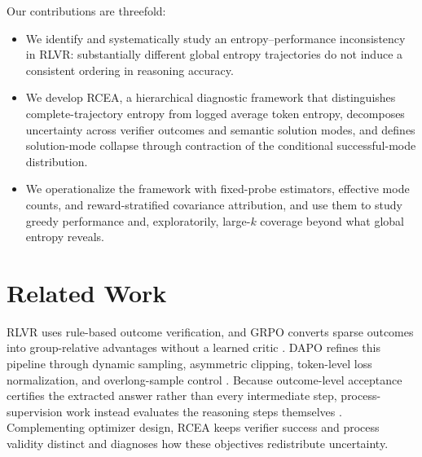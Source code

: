 \documentclass[letterpaper]{article} %
\begin{document}
Our contributions are threefold:
\begin{itemize}
	\item We identify and systematically study an entropy--performance inconsistency in RLVR: substantially different global entropy trajectories do not induce a consistent ordering in reasoning accuracy.
	\item We develop RCEA, a hierarchical diagnostic framework that distinguishes complete-trajectory entropy from logged average token entropy, decomposes uncertainty across verifier outcomes and semantic solution modes, and defines solution-mode collapse through contraction of the conditional successful-mode distribution.
	\item We operationalize the framework with fixed-probe estimators, effective mode counts, and reward-stratified covariance attribution, and use them to study greedy performance and, exploratorily, large-$k$ coverage beyond what global entropy reveals.
\end{itemize}

\section{Related Work}
RLVR uses rule-based outcome verification, and GRPO converts sparse outcomes into group-relative advantages without a learned critic \citep{shao2024deepseekmath,deepseekai2025r1,hu2025openreasonerzero,zeng2025simplerlzoo}. DAPO refines this pipeline through dynamic sampling, asymmetric clipping, token-level loss normalization, and overlong-sample control \citep{yu2025dapo}. Because outcome-level acceptance certifies the extracted answer rather than every intermediate step, process-supervision work instead evaluates the reasoning steps themselves \citep{uesato2022solving,lightman2024verify}. Complementing optimizer design, RCEA keeps verifier success and process validity distinct and diagnoses how these objectives redistribute uncertainty.
\end{document}
